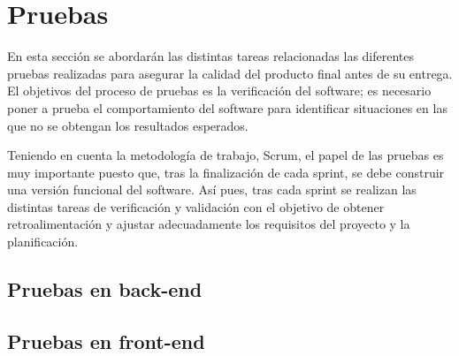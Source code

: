 \chapter{Pruebas}

En esta sección se abordarán las distintas tareas relacionadas las diferentes pruebas realizadas para asegurar la calidad del producto final antes de su entrega. El  objetivos del proceso de pruebas es la verificación del software; es necesario poner a prueba el comportamiento del software para identificar situaciones en las que no se obtengan los resultados esperados.

Teniendo en cuenta la metodología de trabajo, Scrum, el papel de las pruebas es muy importante puesto que, tras la finalización de cada sprint, se debe construir una versión funcional del software. Así pues, tras cada sprint se realizan las distintas tareas de verificación y validación con el objetivo de obtener retroalimentación y ajustar adecuadamente los requisitos del proyecto y la planificación.

\section{Pruebas en back-end}
\section{Pruebas en front-end}